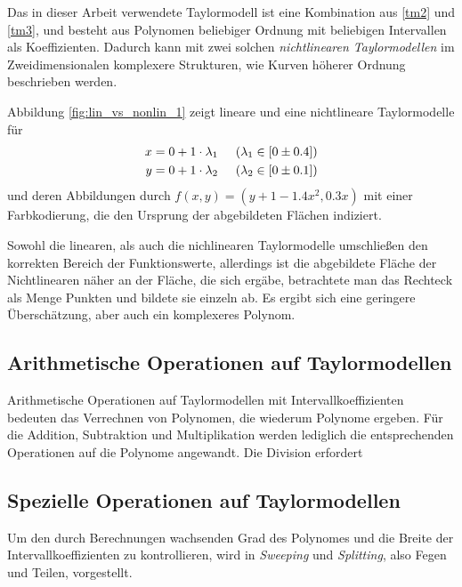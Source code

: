 Das in dieser Arbeit verwendete Taylormodell ist eine Kombination aus \ref{tm2} und \ref{tm3}, und besteht aus Polynomen beliebiger Ordnung mit beliebigen Intervallen als Koeffizienten. Dadurch kann mit zwei solchen \textit{nichtlinearen Taylormodellen} im Zweidimensionalen komplexere Strukturen, wie Kurven höherer Ordnung beschrieben werden.

Abbildung \ref{fig:lin_vs_nonlin_1} zeigt lineare und eine nichtlineare Taylormodelle für
\begin{align*}
x = 0 + 1 \cdot \lambda_1 & \hspace{0.5cm} (\lambda_1 \in [0 \pm 0.4]) \\
 y = 0 + 1 \cdot \lambda_2 & \hspace{0.5cm} (\lambda_2 \in [0 \pm 0.1])
\end{align*}
und deren Abbildungen durch $f(x,y) = (y + 1- 1.4 x^2,0.3x)$ mit einer Farbkodierung, die den Ursprung der abgebildeten Flächen indiziert.


Sowohl die linearen, als auch die nichlinearen Taylormodelle umschließen den korrekten Bereich der Funktionswerte, allerdings ist die abgebildete Fläche der Nichtlinearen näher an der Fläche, die sich ergäbe, betrachtete man das Rechteck als Menge Punkten und bildete sie einzeln ab. Es ergibt sich eine geringere Überschätzung, aber auch ein komplexeres Polynom.


    \subsection{Arithmetische Operationen auf Taylormodellen}

Arithmetische Operationen auf Taylormodellen mit Intervallkoeffizienten bedeuten das Verrechnen von Polynomen, die wiederum Polynome ergeben. Für die Addition, Subtraktion und Multiplikation werden lediglich die entsprechenden Operationen auf die Polynome angewandt. Die Division erfordert



    \subsection{Spezielle Operationen auf Taylormodellen}
Um den durch Berechnungen wachsenden Grad des Polynomes und die Breite der Intervallkoeffizienten zu kontrollieren, wird in \cite{DBLP:conf/macis/BrausseKM15} \textit{Sweeping} und \textit{Splitting}, also Fegen und Teilen, vorgestellt. 


